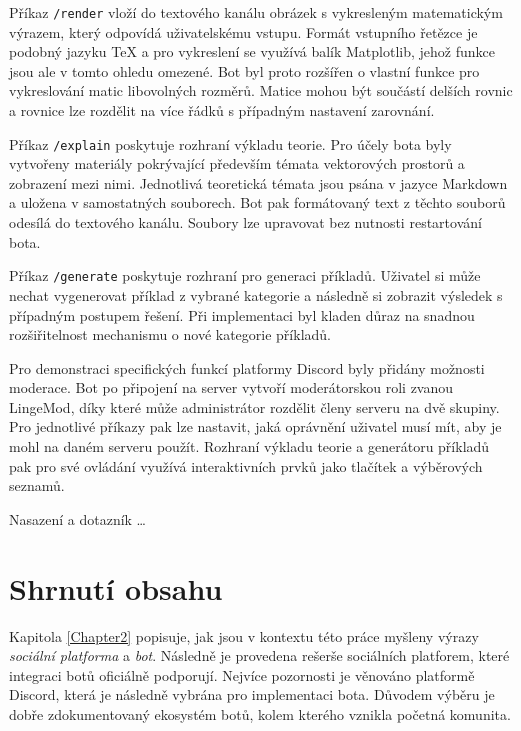 \documentclass[FM]{tulthesis}
\begin{document}
	Příkaz \verb|/render| vloží do textového kanálu obrázek s vykresleným matematickým výrazem, který odpovídá uživatelskému vstupu. Formát vstupního řetězce je podobný jazyku TeX a pro vykreslení se využívá balík Matplotlib, jehož funkce jsou ale v tomto ohledu omezené. Bot byl proto rozšířen o vlastní funkce pro vykreslování matic libovolných rozměrů. Matice mohou být součástí delších rovnic a rovnice lze rozdělit na více řádků s případným nastavení zarovnání.
	
	Příkaz \verb|/explain| poskytuje rozhraní výkladu teorie. Pro účely bota byly vytvořeny materiály pokrývající především témata vektorových prostorů a zobrazení mezi nimi. Jednotlivá teoretická témata jsou psána v jazyce Markdown a uložena v samostatných souborech. Bot pak formátovaný text z těchto souborů odesílá do textového kanálu. Soubory lze upravovat bez nutnosti restartování bota.
	
	Příkaz \verb|/generate| poskytuje rozhraní pro generaci příkladů. Uživatel si může nechat vygenerovat příklad z vybrané kategorie a následně si zobrazit výsledek s případným postupem řešení. Při implementaci byl kladen důraz na snadnou rozšiřitelnost mechanismu o nové kategorie příkladů.
	
	Pro demonstraci specifických funkcí platformy Discord byly přidány možnosti moderace. Bot po připojení na server vytvoří moderátorskou roli zvanou LingeMod, díky které může administrátor rozdělit členy serveru na dvě skupiny. Pro jednotlivé příkazy pak lze nastavit, jaká oprávnění uživatel musí mít, aby je mohl na daném serveru použít. Rozhraní výkladu teorie a generátoru příkladů pak pro své ovládání využívá interaktivních prvků jako tlačítek a výběrových seznamů.
	
	
	Nasazení a dotazník \dots %
	
	\iffalse
	\section{Shrnutí obsahu}
	
	Kapitola \ref{Chapter2} popisuje, jak jsou v kontextu této práce myšleny výrazy \textit{sociální platforma} a \textit{bot}. Následně je provedena rešerše sociálních platforem, které integraci botů oficiálně podporují. Nejvíce pozornosti je věnováno platformě Discord, která je následně vybrána pro implementaci bota. Důvodem výběru je dobře zdokumentovaný ekosystém botů, kolem kterého vznikla početná komunita.
	
\end{document}
